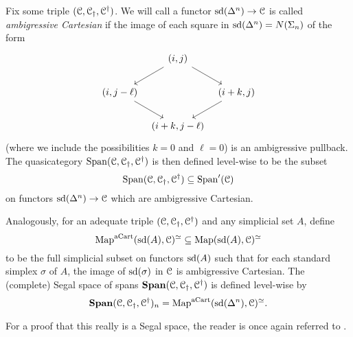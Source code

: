 \documentclass[main.tex]{subfiles}
\begin{document}
Fix some triple $(\mathcal{C}, \mathcal{C}_{\dagger}, \mathcal{C}^{\dagger})$. We will call a functor $\mathrm{sd}(\Delta^{n}) \to \mathcal{C}$ is called \emph{ambigressive Cartesian} if the image of each square in $\mathrm{sd}(\Delta^{n}) = N(\Sigma_{n})$ of the form
\begin{equation*}
  \begin{tikzcd}[column sep=tiny]
    & {(i, j)}
    \arrow[dr]
    \arrow[dl]
    \\
    {(i, j - \ell)}
    \arrow[dr]
    & & {(i + k , j)}
    \arrow[dl]
    \\
    & {(i + k , j - \ell)}
  \end{tikzcd}
\end{equation*}
(where we include the possibilities $k = 0$ and $\ell = 0$) is an ambigressive pullback. The quasicategory $\mathrm{Span}(\mathcal{C}, \mathcal{C}_{\dagger}, \mathcal{C}^{\dagger})$ is then defined level-wise to be the subset
\begin{equation*}
  \mathrm{Span}(\mathcal{C}, \mathcal{C}_{\dagger}, \mathcal{C}^{\dagger}) \subseteq \mathrm{Span}'(\mathcal{C})
\end{equation*}
on functors $\mathrm{sd}(\Delta^{n}) \to \mathcal{C}$ which are ambigressive Cartesian.

Analogously, for an adequate triple $(\mathcal{C}, \mathcal{C}_{\dagger}, \mathcal{C}^{\dagger})$ and any simplicial set $A$, define
\begin{equation*}
  \mathrm{Map}^{\mathrm{aCart}}(\mathrm{sd}(A), \mathcal{C})^{\simeq} \subseteq \mathrm{Map}(\mathrm{sd}(A), \mathcal{C})^{\simeq}
\end{equation*}
to be the full simplicial subset on functors $\mathrm{sd}(A)$ such that for each standard simplex $\sigma$ of $A$, the image of $\mathrm{sd}(\sigma)$ in $\mathcal{C}$ is ambigressive Cartesian. The (complete) Segal space of spans $\mathbf{Span}(\mathcal{C}, \mathcal{C}_{\dagger}, \mathcal{C}^{\dagger})$ is defined level-wise by 
\begin{equation*}
  \mathbf{Span}(\mathcal{C}, \mathcal{C}_{\dagger}, \mathcal{C}^{\dagger})_{n} = \mathrm{Map}^{\mathrm{aCart}}(\mathrm{sd}(\Delta^{n}), \mathcal{C})^{\simeq}.
\end{equation*}

For a proof that this really is a Segal space, the reader is once again referred to \cite{spectralmackeyfunctors1}.
\end{document}
